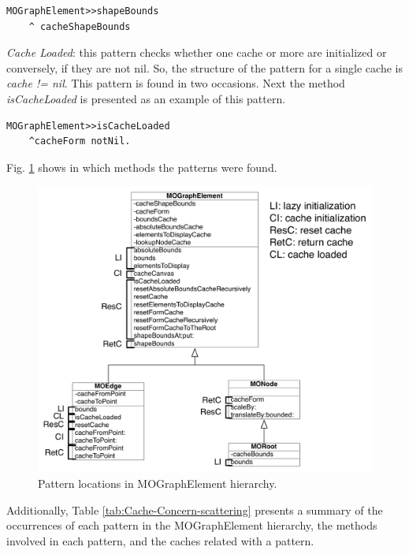 \documentclass[runningheads]{llncs}
\begin{document}
\begin{lstlisting} 
MOGraphElement>>shapeBounds  
	^ cacheShapeBounds
\end{lstlisting}

\emph{Cache Loaded}: this pattern checks whether one cache or more
are initialized or conversely, if they are not nil. So, the structure of the
pattern for a single cache is \emph{cache != nil}. This pattern is
found in two occasions. Next the method \emph{isCacheLoaded} is presented
as an example of this pattern.

\begin{lstlisting} 
MOGraphElement>>isCacheLoaded 
	^cacheForm notNil. 
\end{lstlisting}

Fig. \ref{fig:Pattern-locations-in} shows in which methods the patterns
were found.%
\begin{figure}
\begin{centering}
\includegraphics[bb=186bp 306bp 457bp 644bp,scale=0.9]{PatternLocation} 
\par\end{centering}

\caption{Pattern locations in MOGraphElement hierarchy.\label{fig:Pattern-locations-in}}

\end{figure}


Additionally, Table \ref{tab:Cache-Concern-scattering} presents a
summary of the occurrences of each pattern in the MOGraphElement hierarchy,
the methods involved in each pattern, and the caches related with
a pattern.
\end{document}
